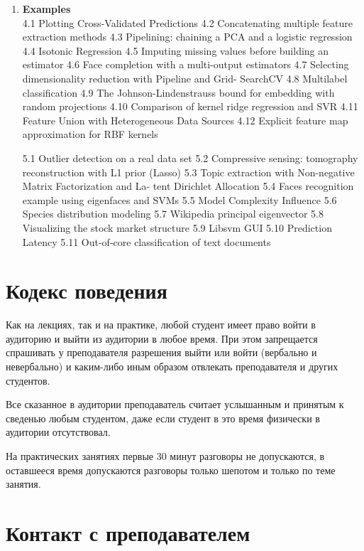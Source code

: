 \documentclass{article}
\begin{document}
\begin{enumerate}
\item \textbf{Examples} \\
4.1 Plotting Cross-Validated Predictions
4.2 Concatenating multiple feature extraction methods
4.3 Pipelining: chaining a PCA and a logistic regression
4.4 Isotonic Regression
4.5 Imputing missing values before building an estimator
4.6 Face completion with a multi-output estimators
4.7 Selecting dimensionality reduction with Pipeline and Grid-
SearchCV
4.8 Multilabel classification
4.9 The Johnson-Lindenstrauss bound for embedding with random
projections
4.10 Comparison of kernel ridge regression and SVR
4.11 Feature Union with Heterogeneous Data Sources
4.12 Explicit feature map approximation for RBF kernels

5.1 Outlier detection on a real data set
5.2 Compressive sensing: tomography reconstruction with L1 prior
(Lasso)
5.3 Topic extraction with Non-negative Matrix Factorization and La-
tent Dirichlet Allocation
5.4 Faces recognition example using eigenfaces and SVMs
5.5 Model Complexity Influence
5.6 Species distribution modeling
5.7 Wikipedia principal eigenvector
5.8 Visualizing the stock market structure
5.9 Libsvm GUI
5.10 Prediction Latency
5.11 Out-of-core classification of text documents



\end{enumerate}



\section{Кодекс поведения}

Как на лекциях, так и на практике, любой студент имеет право войти в аудиторию и выйти из аудитории в любое время. При этом запрещается спрашивать у преподавателя разрешения выйти или войти (вербально и невербально) и каким-либо иным образом отвлекать преподавателя и других студентов.

Все сказанное в аудитории преподаватель считает услышанным и принятым к сведенью любым студентом, даже если студент в это время физически в аудитории отсутствовал.

На практических занятиях первые 30 минут разговоры не допускаются, в оставшееся время допускаются  разговоры только шепотом и только по теме занятия.


\section{Контакт с преподавателем}
\end{document}
